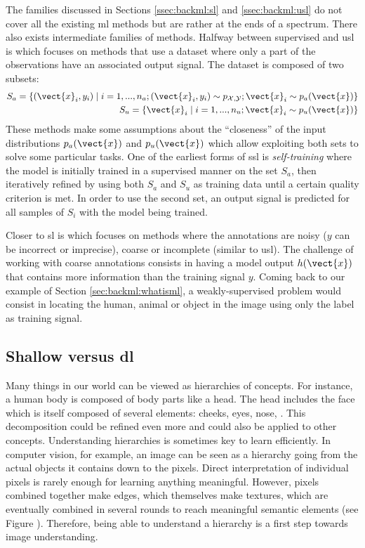 The families discussed in Sections \ref{ssec:backml:sl} and \ref{ssec:backml:usl} do not cover all the existing \acrlong{ml} methods but are rather at the ends of a spectrum. There also exists intermediate families of methods. Halfway between supervised and \acrlong{usl} is  which focuses on methods that use a dataset where only a part of the observations have an associated output signal. The dataset is composed of two subsets:
\begin{eqnarray}
S_a = \left\{(\vect{x}_i, y_i) \mid i = 1,...,n_a; (\vect{x}_i, y_i) \sim p_{\mathcal{X},\mathcal{Y}}; \vect{x}_i \sim p_a(\vect{x})\right\} \\
S_u = \left\{\vect{x}_i \mid i = 1,...,n_u; \vect{x}_i \sim p_u(\vect{x})\right\}
\end{eqnarray}
These  methods make some assumptions about the ``closeness'' of the input distributions $p_a(\vect{x})$ and $p_u(\vect{x})$ \parencite{chapelle2006semi} which allow exploiting both sets to solve some particular tasks. One of the earliest forms of \acrlong{ssl} is \textit{self-training} where the model is initially trained in a supervised manner on the set $S_a$, then iteratively refined by using both $S_a$ and $S_u$ as training data until a certain quality criterion is met. In order to use the second set, an output signal is predicted for all samples of $S_i$ with the model being trained. 

Closer to \acrlong{sl} is  which focuses on methods where the annotations are noisy (\eg $y$ can be incorrect or imprecise), coarse or incomplete (similar to \acrlong{usl}). The challenge of working with coarse annotations consists in having a model output $h(\vect{x})$ that contains more information than the training signal $y$. Coming back to our example of Section \ref{sec:backml:whatisml}, a weakly-supervised problem would consist in locating the human, animal or object in the image using only the label as training signal.


\subsection{Shallow versus \acrlong{dl}}
\label{ssec:backml:shallowdeep}

Many things in our world can be viewed as hierarchies of concepts. For instance, a human body is composed of body parts like a head. The head includes the face which is itself composed of several elements: cheeks, eyes, nose, \etc. This decomposition could be refined even more and could also be applied to other concepts. Understanding hierarchies is sometimes key to learn efficiently. In computer vision, for example, an image can be seen as a hierarchy going from the actual objects it contains down to the pixels. Direct interpretation of individual pixels is rarely enough for learning anything meaningful. However, pixels combined together make edges, which themselves make textures, which are eventually combined in several rounds to reach meaningful semantic elements (see Figure ). Therefore, being able to understand a hierarchy is a first step towards image understanding.   

